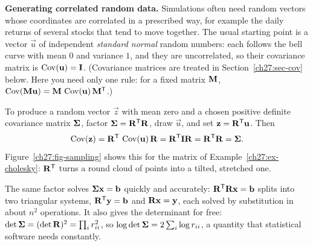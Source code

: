 \begin{applicationbox}
\textbf{Generating correlated random data.} Simulations often need random vectors whose coordinates
are correlated in a prescribed way, for example the daily returns of several stocks that tend to
move together. The usual starting point is a vector $\vec{u}$ of independent \emph{standard normal}
random numbers: each follows the bell curve with mean $0$ and variance $1$, and they are
uncorrelated, so their covariance matrix is $\operatorname{Cov}(\mathbf{u})=\mathbf{I}$. (Covariance matrices are
treated in Section~\ref{ch27:sec-cov} below. Here you need only one rule: for a fixed matrix
$\mathbf{M}$, $\operatorname{Cov}(\mathbf{M}\mathbf{u}) = \mathbf{M}\,\operatorname{Cov}(\mathbf{u})\,\mathbf{M}^{\mathsf{T}}$.)

To produce a random vector $\vec{z}$ with mean zero and a chosen positive definite covariance matrix
$\mathbf{\Sigma}$, factor $\mathbf{\Sigma}=\mathbf{R}^{\mathsf{T}}\mathbf{R}$, draw $\vec{u}$, and set $\mathbf{z} =
\mathbf{R}^{\mathsf{T}}\mathbf{u}$. Then
\[
  \operatorname{Cov}(\mathbf{z}) = \mathbf{R}^{\mathsf{T}}\,\operatorname{Cov}(\mathbf{u})\,\mathbf{R} = \mathbf{R}^{\mathsf{T}}\mathbf{I}\mathbf{R} = \mathbf{R}^{\mathsf{T}}\mathbf{R}
  = \mathbf{\Sigma}.
\]
Figure~\ref{ch27:fig-sampling} shows this for the matrix of Example~\ref{ch27:ex-cholesky}: $\mathbf{R}^{\mathsf{T}}$
turns a round cloud of points into a tilted, stretched one.

The same factor solves $\mathbf{\Sigma}\mathbf{x}=\mathbf{b}$ quickly and accurately: $\mathbf{R}^{\mathsf{T}}\mathbf{R}\mathbf{x}
= \mathbf{b}$ splits into two triangular systems, $\mathbf{R}^{\mathsf{T}}\mathbf{y} = \mathbf{b}$ and $\mathbf{R}\mathbf{x} =
\mathbf{y}$, each solved by substitution in about $n^2$ operations. It also gives the determinant for
free: $\det\mathbf{\Sigma} = (\det\mathbf{R})^2 = \prod_i r_{ii}^2$, so $\log\det\mathbf{\Sigma} = 2\sum_i \log
r_{ii}$, a quantity that statistical software needs constantly.
\end{applicationbox}

